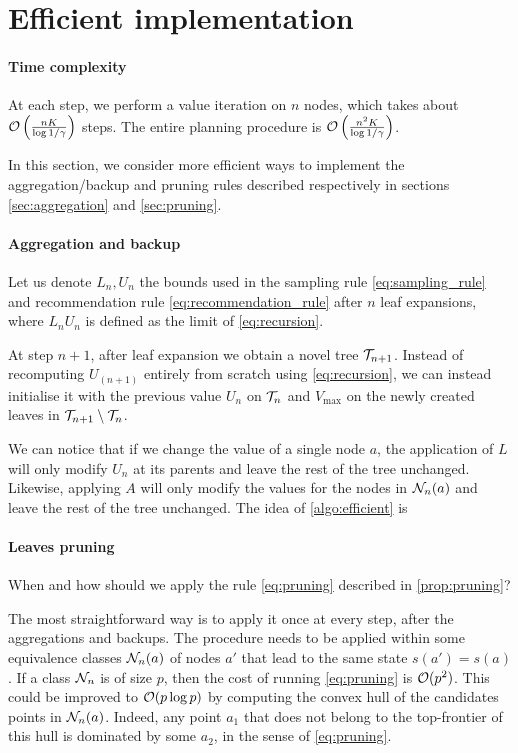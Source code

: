 \documentclass{article}
\begin{document}
\section{Efficient implementation}

\paragraph{Time complexity}
 At each step, we perform a value iteration on $n$ nodes, which takes about $\mathcal{O}\left(\frac{n K}{\log 1/\gamma}\right)$ steps. The entire planning procedure is $\mathcal{O}\left(\frac{n^2 K}{\log 1/\gamma}\right)$.

In this section, we consider more efficient ways to implement the aggregation/backup and pruning rules described respectively in sections \ref{sec:aggregation} and \ref{sec:pruning}.

\paragraph{Aggregation and backup}
Let us denote $L_n,U_n$ the bounds used in the sampling rule \eqref{eq:sampling_rule} and recommendation rule \eqref{eq:recommendation_rule} after $n$ leaf expansions, where $L_nU_n$ is defined as the limit of \eqref{eq:recursion}.

At step $n+1$, after leaf expansion we obtain a novel tree $\mathcal{T}_{n+1}$. Instead of recomputing $U_{(n+1)}$ entirely from scratch using \eqref{eq:recursion}, we can instead initialise it with the previous value $U_{n}$ on $\mathcal{T}_n$ and $V_{\max}$ on the newly created leaves in $\mathcal{T}_{n+1} \setminus \mathcal{T}_n$.

We can notice that if we change the value of a single node $a$, the application of $L$ will only modify $U_{n}$ at its parents and leave the rest of the tree unchanged. Likewise, applying $A$ will only modify the values for the nodes in $\mathcal{N}_n(a)$ and leave the rest of the tree unchanged. The idea of \autoref{algo:efficient} is

\paragraph{Leaves pruning}

When and how should we apply the rule \eqref{eq:pruning} described in \autoref{prop:pruning}?

The most straightforward way is to apply it once at every step, after the aggregations and backups.
The procedure needs to be applied within some equivalence classes $\mathcal{N}_n(a)$ of nodes $a'$ that lead to the same state $s(a')=s(a)$. If a class $\mathcal{N}_n$ is of size $p$, then the cost of running \eqref{eq:pruning} is $\mathcal{O}(p^2)$. This could be improved to $\mathcal{O}(p \log p)$ by computing the convex hull of the candidates points in $\mathcal{N}_n(a)$. Indeed, any point $a_1$ that does not belong to the top-frontier of this hull is dominated by some $a_2$, in the sense of \eqref{eq:pruning}.
\end{document}
